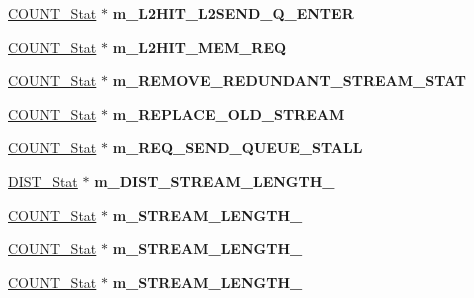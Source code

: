 \begin{DoxyCompactItemize}
\item 
\hypertarget{classall__stats__c_a991e9001cbc4759fdeedca0dbe908b20}{
\hyperlink{classCOUNT__Stat}{COUNT\_\-Stat} $\ast$ {\bfseries m\_\-L2HIT\_\-L2SEND\_\-Q\_\-ENTER}}
\label{classall__stats__c_a991e9001cbc4759fdeedca0dbe908b20}

\item 
\hypertarget{classall__stats__c_adab7fc9790927cd8b0216e86d0da78a7}{
\hyperlink{classCOUNT__Stat}{COUNT\_\-Stat} $\ast$ {\bfseries m\_\-L2HIT\_\-MEM\_\-REQ}}
\label{classall__stats__c_adab7fc9790927cd8b0216e86d0da78a7}

\item 
\hypertarget{classall__stats__c_ad9ec9bdcc59b819b77dee67d34df18eb}{
\hyperlink{classCOUNT__Stat}{COUNT\_\-Stat} $\ast$ {\bfseries m\_\-REMOVE\_\-REDUNDANT\_\-STREAM\_\-STAT}}
\label{classall__stats__c_ad9ec9bdcc59b819b77dee67d34df18eb}

\item 
\hypertarget{classall__stats__c_a29835e8036a501f541f3dec25e841669}{
\hyperlink{classCOUNT__Stat}{COUNT\_\-Stat} $\ast$ {\bfseries m\_\-REPLACE\_\-OLD\_\-STREAM}}
\label{classall__stats__c_a29835e8036a501f541f3dec25e841669}

\item 
\hypertarget{classall__stats__c_a209f5e468b057aceedb3368191ef7452}{
\hyperlink{classCOUNT__Stat}{COUNT\_\-Stat} $\ast$ {\bfseries m\_\-REQ\_\-SEND\_\-QUEUE\_\-STALL}}
\label{classall__stats__c_a209f5e468b057aceedb3368191ef7452}

\item 
\hypertarget{classall__stats__c_a5abc57871764e301f07cc1a2ee1a2066}{
\hyperlink{classDIST__Stat}{DIST\_\-Stat} $\ast$ {\bfseries m\_\-DIST\_\-STREAM\_\-LENGTH\_}}
\label{classall__stats__c_a5abc57871764e301f07cc1a2ee1a2066}

\item 
\hypertarget{classall__stats__c_ac42925cee0f8bfd8174ac2714fa2edd7}{
\hyperlink{classCOUNT__Stat}{COUNT\_\-Stat} $\ast$ {\bfseries m\_\-STREAM\_\-LENGTH\_}}
\label{classall__stats__c_ac42925cee0f8bfd8174ac2714fa2edd7}

\item 
\hypertarget{classall__stats__c_aeb4f71505e6927ea197613b26b42e6ec}{
\hyperlink{classCOUNT__Stat}{COUNT\_\-Stat} $\ast$ {\bfseries m\_\-STREAM\_\-LENGTH\_}}
\label{classall__stats__c_aeb4f71505e6927ea197613b26b42e6ec}

\item 
\hypertarget{classall__stats__c_ac0a92e0f952c273e728cb916686748b0}{
\hyperlink{classCOUNT__Stat}{COUNT\_\-Stat} $\ast$ {\bfseries m\_\-STREAM\_\-LENGTH\_}}
\label{classall__stats__c_ac0a92e0f952c273e728cb916686748b0}


\end{DoxyCompactItemize}
